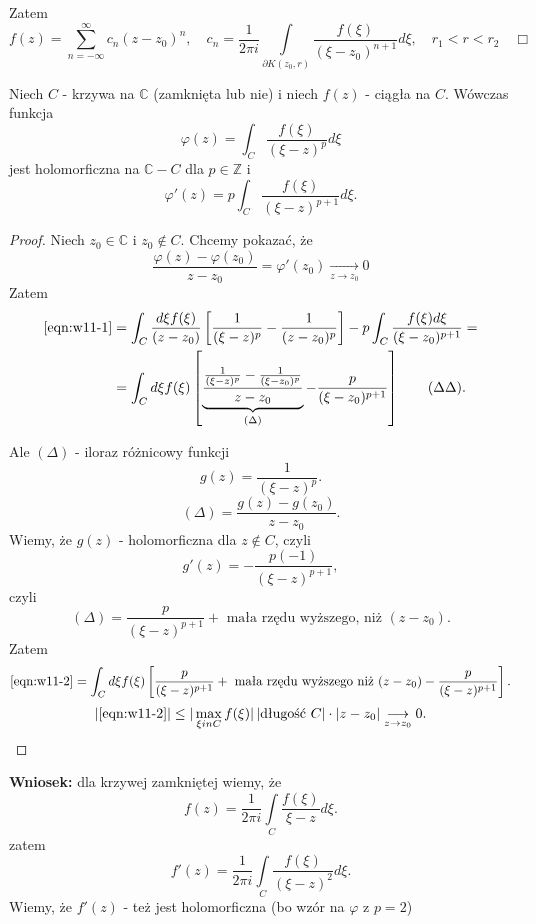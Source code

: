 \documentclass[../main.tex]{subfiles}
\begin{document}
 Zatem
 \[
     f(z) = \sum_{n=-\infty}^{\infty} c_n (z-z_0)^n, \quad c_n = \frac{1}{2\pi i} \int\limits_{\partial K(z_0,r)} \frac{f(\xi)}{(\xi - z_0)^{n+1}}d\xi, \quad r_1<r<r_2 \quad\Box
 \]

 \begin{tw}
     Niech $C$ - krzywa na $\mathbb{C}$ (zamknięta lub nie) i niech $f(z)$ - ciągła na $C$. Wówczas funkcja
     \[
         \varphi(z) = \int_C \frac{f(\xi)}{(\xi - z)^p}d\xi
     \]
     jest holomorficzna na $\mathbb{C}-C$ dla $p\in \mathbb{Z}$ i
     \[
         \varphi'(z) = p\int_C \frac{f(\xi)}{(\xi - z)^{p+1}}d\xi
     .\]
 \end{tw}
 \begin{proof}
     Niech $z_0\in\mathbb{C}$ i $z_0\not\in C$. Chcemy pokazać, że
     \begin{equation}
         \label{eqn:w11-1}
         \frac{\varphi(z) - \varphi(z_0)}{z-z_0} = \varphi'(z_0) \underset{z \to z_0}{\longrightarrow} 0 \tag{*}
     \end{equation}
 Zatem
 \begin{align}
     \label{eqn:w11-2}
     \eqref{eqn:w11-1} &= \int_C \frac{d\xi f(\xi)}{(z-z_0)}\left[ \frac{1}{(\xi - z)^p} - \frac{1}{(z-z_0)^p} \right] - p\int_C \frac{f(\xi) d\xi}{(\xi - z_0)^{p+1}} = \\
     &= \int_C d\xi f(\xi) \left[ \underbrace{\frac{\frac{1}{(\xi - z)^p} - \frac{1}{(\xi - z_0)^p}}{z-z_0}}_{(\Delta)} - \frac{p}{(\xi - z_0)^{p+1}} \right] \tag{$\Delta\Delta$}
 .\end{align}

 Ale $(\Delta)$ - iloraz różnicowy funkcji \[
     g(z) = \frac{1}{(\xi - z)^p}
 .\]
 \[
     (\Delta) = \frac{g(z) - g(z_0)}{z-z_0}
 .\]
 Wiemy, że $g(z)$ - holomorficzna dla $z\not\in C$, czyli
      \[
          g'(z) = -\frac{p(-1)}{(\xi - z)^{p+1}}
     ,\]
 czyli
     \[
         (\Delta) = \frac{p}{(\xi - z)^{p+1}} + \text{ mała rzędu wyższego, niż }(z-z_0)
     .\]
 Zatem
     \[
         \eqref{eqn:w11-2} = \int_C d\xi f(\xi) \left[ \frac{p}{(\xi - z)^{p+1}} + \text{ mała rzędu wyższego niż }(z-z_0) - \frac{p}{(\xi - z)^{p+1}} \right]
     .\]
 \[
     |\eqref{eqn:w11-2}| \le |\max\limits_{\xi in C} f(\xi)|\left| \text{długość }C\right|\cdot  |z-z_0| \underset{z\to z_0}{\longrightarrow} 0
 .\]
 \end{proof}
 \textbf{Wniosek:} dla krzywej zamkniętej wiemy, że
 \[
     f(z) = \frac{1}{2\pi i}\int\limits_C \frac{f(\xi)}{\xi - z}d\xi
 .\]
 zatem
 \[
     f'(z) = \frac{1}{2\pi i}\int\limits_C \frac{f(\xi)}{(\xi - z)^2}d\xi
 .\]
 Wiemy, że $f'(z)$ - też jest holomorficzna (bo wzór na $\varphi$ z $p = 2$)
\end{document}
